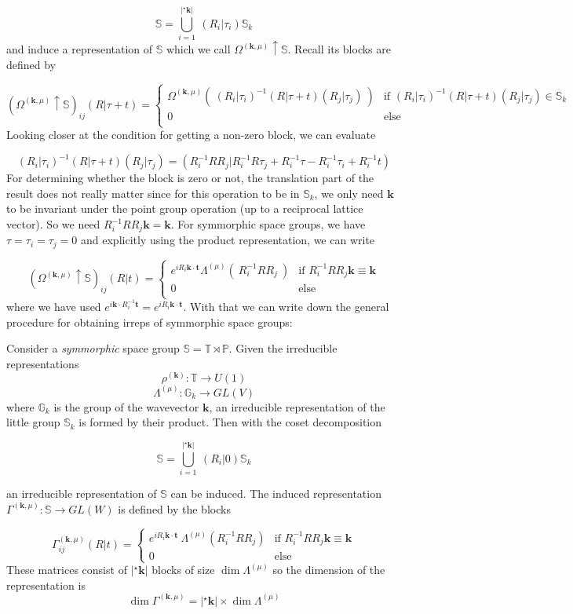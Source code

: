 \documentclass[9 pt]{report}
\def\*#1{\boldsymbol{#1}}
\begin{document}
$$ \mathbb{S} = \bigcup_{i=1}^{|^\star\*k|}\:(R_i|\tau_i)\mathbb{S}_k $$
and induce a representation of $\mathbb{S}$ which we call $\Omega^{(\*k,\mu)}\uparrow\mathbb{S}$. Recall its blocks are defined by

$$ (\Omega^{(\*k,\mu)}\uparrow\mathbb{S})_{ij}(R|\tau+t) = 
	\begin{cases}
		\Omega^{(\*k,\mu)}(\: (R_i|\tau_i)^{-1}(R|\tau+t)(R_j|\tau_j) \:) & \text{if } (R_i|\tau_i)^{-1}(R|\tau+t)(R_j|\tau_j) \in \mathbb{S}_k \\
		0 & \text{else}\\ 
	\end{cases} $$
Looking closer at the condition for getting a non-zero block, we can evaluate

$$ (R_i|\tau_i)^{-1}(R|\tau+t)(R_j|\tau_j) = (R_i^{-1}RR_j| R_i^{-1}R\tau_j + R_i^{-1}\tau - R^{-1}_i\tau_i + R^{-1}_i t) $$
For determining whether the block is zero or not, the translation part of the result does not really matter since for this operation to be in $\mathbb{S}_k$, we only need $\*k$ to be invariant under the point group operation (up to a reciprocal lattice vector). So we need $R_i^{-1}RR_j\*k = \*k$. For symmorphic space groups, we have $\tau=\tau_i=\tau_j=0$ and explicitly using the product representation, we can write

$$ (\Omega^{(\*k,\mu)}\uparrow\mathbb{S})_{ij}(R|t) = 
\begin{cases}
e^{iR_i\*k\cdot\*t}\Lambda^{(\mu)}(\:R_i^{-1}RR_j\:) & \text{if }  R_i^{-1}RR_j\*k \equiv \*k \\
0 & \text{else}\\ 
\end{cases} $$
where we have used $e^{i\*k\cdot R_i^{-1}\*t} = e^{iR_i\*k\cdot\*t}$. With that we can write down the general procedure for obtaining irreps of symmorphic space groups:

\begin{tcolorbox}
	Consider a \emph{symmorphic} space group $\mathbb{S} = \mathbb{T}\rtimes\mathbb{P}$. Given the irreducible representations
	$$\rho^{(\*k)}:\mathbb{T}\to U(1)$$
	$$ \Lambda^{(\mu)}:\mathbb{G}_k \to GL(V) $$
	where $\mathbb{G}_k$ is the group of the wavevector $\*k$, an irreducible representation of the little group $\mathbb{S}_k$ is formed by their product. Then with the coset decomposition
	
	$$ \mathbb{S} = \bigcup_{i=1}^{|^\star\*k|}\:(R_i|0)\mathbb{S}_k $$
	
	an irreducible representation of $\mathbb{S}$ can be induced. The induced representation $\Gamma^{(\*k,\mu)}:\mathbb{S}\to GL(W)$ is defined by the blocks
	
	$$ \Gamma^{(\*k,\mu)}_{ij}(R|t) = 
	\begin{cases}
		e^{i R_i \*k\cdot\*t}\:\Lambda^{(\mu)}(R_i^{-1}R R_j) & \text{if } R_i^{-1}R R_j  \*k \equiv \*k \\
		0 & \text{else}
	\end{cases} $$
	These matrices consist of $|^\star\*k|$ blocks of size $\dim\Lambda^{(\mu)}$ so the dimension of the representation is
	$$ \dim \Gamma^{(\*k,\mu)} = |^\star\*k| \times\dim\Lambda^{(\mu)} $$
\end{tcolorbox}
\end{document}
